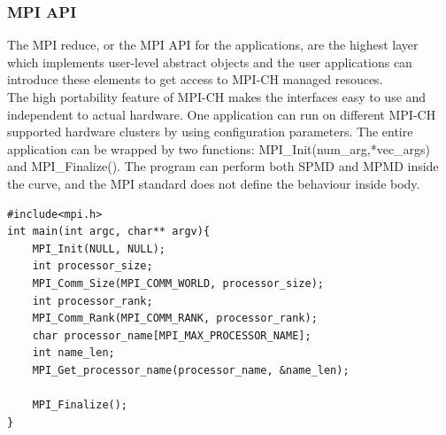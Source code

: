 \documentclass[11pt,openright,a4paper]{report}
\begin{document}
\subsubsection{MPI API}
The MPI reduce, or the MPI API for the applications, are the highest layer which implements user-level abstract objects and the user applications can introduce these elements to get access to MPI-CH managed resouces.\\
The high portability feature of MPI-CH makes the interfaces easy to use and independent to actual hardware. One application can run on different MPI-CH supported hardware clusters by using configuration parameters. The entire application can be wrapped by two functions: MPI\_Init(num\_arg,*vec\_args) and MPI\_Finalize(). The program can perform both SPMD and MPMD inside the curve, and the MPI standard does not define the behaviour inside body\cite{mpich_doc}.\\  
\begin{lstlisting}[breaklines,breakatwhitespace,caption={Example of using MPICH initialization-finalization pair in C},label=compression-psudoCode]
#include<mpi.h>
int main(int argc, char** argv){
	MPI_Init(NULL, NULL);
	int processor_size;
	MPI_Comm_Size(MPI_COMM_WORLD, processor_size);
	int processor_rank;
	MPI_Comm_Rank(MPI_COMM_RANK, processor_rank);
	char processor_name[MPI_MAX_PROCESSOR_NAME];
	int name_len;
	MPI_Get_processor_name(processor_name, &name_len);

	MPI_Finalize();
}
\end{lstlisting}
\end{document}
